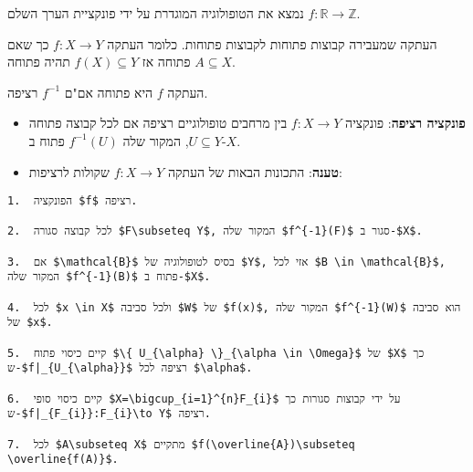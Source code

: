 \documentclass{tstextbook}
\begin{document}
\begin{example}
נמצא את הטופולוגיה המוגדרת על ידי פונקציית הערך השלם \(f:\mathbb{R}\to \mathbb{Z}\).

\end{example}
\begin{definition}
העתקה שמעבירה קבוצות פתוחות לקבוצות פתוחות. כלומר העתקה \(f:X\to Y\) כך שאם \(A\subseteq X\) פתוחה אז \(f(X)\subseteq Y\) תהיה פתוחה.

\end{definition}
\begin{proposition}
העתקה \(f\) היא פתוחה אם"ם \(f^{-1}\) רציפה.

\end{proposition}
\begin{summary}
  \begin{itemize}
    \item \textbf{פונקציה רציפה}: פונקציה \(f:X\to Y\) בין מרחבים טופולוגיים רציפה אם לכל קבוצה פתוחה \(U \subseteq Y\), המקור שלה \(f^{-1}(U)\) פתוח ב-\(X\).
    \item \textbf{טענה}: התכונות הבאות של העתקה \(f:X\to Y\) שקולות לרציפות:
  \end{itemize}
\end{summary}
\begin{verbatim}
1.  הפונקציה $f$ רציפה.

2.  לכל קבוצה סגורה $F\subseteq Y$, המקור שלה $f^{-1}(F)$ סגור ב-$X$.

3.  אם $\mathcal{B}$ בסיס לטופולוגיה של $Y$, אזי לכל $B \in \mathcal{B}$, המקור שלה $f^{-1}(B)$ פתוח ב-$X$.

4.  לכל $x \in X$ ולכל סביבה $W$ של $f(x)$, המקור שלה $f^{-1}(W)$ הוא סביבה של $x$.

5.  קיים כיסוי פתוח $\{ U_{\alpha} \}_{\alpha \in \Omega}$ של $X$ כך ש-$f|_{U_{\alpha}}$ רציפה לכל $\alpha$.

6.  קיים כיסוי סופי $X=\bigcup_{i=1}^{n}F_{i}$ על ידי קבוצות סגורות כך ש-$f|_{F_{i}}:F_{i}\to Y$ רציפה.

7.  לכל $A\subseteq X$ מתקיים $f(\overline{A})\subseteq \overline{f(A)}$.

\end{verbatim}
\end{document}
